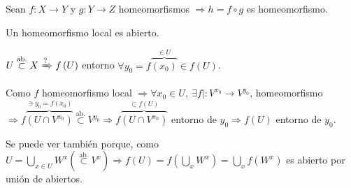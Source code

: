 \begin{prop}
Sean $f: X \rightarrow Y$ y $g: Y \rightarrow Z$ homeomorfismos $\Rightarrow h = f \circ g$ es homeomorfismo.
\end{prop}

\begin{prop}
Un homeomorfismo local es abierto.
\end{prop}
\begin{demo}
    $U \stackrel{\text{ab.}}{\subset} X \xRightarrow{?} f\left( U \right)$ entorno $\forall y_0 = f\overbrace{\left( x_0 \right)}^{\in U} \in f\left( U \right)$.

    Como $f$ homeomorfismo local $\Rightarrow \forall x_0 \in U,\ \exists f| : V^{x_0} \rightarrow V^{y_0}$, homeomorfismo $\Rightarrow f\overbrace{\left( U \cap V^{x_0} \right)}^{\ni y_0 = f\left( x_0 \right)} \stackrel{\text{ab.}}{\subset} V^{y_0} \Rightarrow f\overbrace{\left( U \cap V^{x_0} \right)}^{\subset f\left( U \right)}$ entorno de $y_0 \Rightarrow f\left( U \right)$ entorno de $y_0$.

    Se puede ver también porque, como $U = \bigcup_{x \in U} W^x (\stackrel{\text{ab.}}{\subset} V^{x}) \Rightarrow f\left( U \right) = f\left( \bigcup_{x} W^{x} \right) = \bigcup_{x} f\left( W^x \right)$ es abierto por unión de abiertos.
\end{demo}


